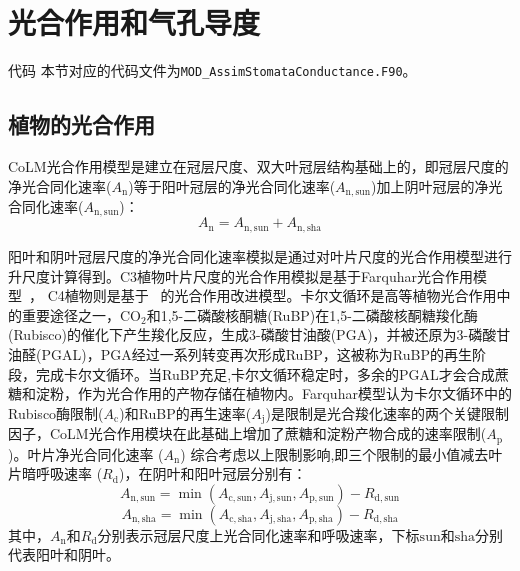 \chapter{光合作用和气孔导度}
\begin{mymdframed}{代码}
本节对应的代码文件为\texttt{MOD\_AssimStomataConductance.F90}。
\end{mymdframed}


\section{植物的光合作用}\label{植物的光合作用}
CoLM光合作用模型是建立在冠层尺度、双大叶冠层结构基础上的，即冠层尺度的净光合同化速率($A_{\mathrm{n}}$)等于阳叶冠层的净光合同化速率($A_{\mathrm{n,sun}}$)加上阴叶冠层的净光合同化速率($A_{\mathrm{n,sun}}$)：
\begin{equation}\label{Ansun_Ansha}
A_{\mathrm{n}}=A_{\mathrm{n,sun}}+A_{\mathrm{n,sha}}
\end{equation}

阳叶和阴叶冠层尺度的净光合同化速率模拟是通过对叶片尺度的光合作用模型进行升尺度计算得到。C3植物叶片尺度的光合作用模拟是基于Farquhar光合作用模型~\citep{farquhar1980biochemical}，
C4植物则是基于~\citet{collatz1992} 的光合作用改进模型。卡尔文循环是高等植物光合作用中的重要途径之一，CO$_2$和1,5-二磷酸核酮糖(RuBP)在1,5-二磷酸核酮糖羧化酶(Rubisco)的催化下产生羧化反应，生成3-磷酸甘油酸(PGA)，并被还原为3-磷酸甘油醛(PGAL)，PGA经过一系列转变再次形成RuBP，这被称为RuBP的再生阶段，完成卡尔文循环。当RuBP充足,卡尔文循环稳定时，多余的PGAL才会合成蔗糖和淀粉，作为光合作用的产物存储在植物内。Farquhar模型认为卡尔文循环中的Rubisco酶限制($A_{\mathrm{c}}$)和RuBP的再生速率($A_{\mathrm{j}}$)是限制是光合羧化速率的两个关键限制因子，CoLM光合作用模块在此基础上增加了蔗糖和淀粉产物合成的速率限制($A_{\mathrm{p}}$)。叶片净光合同化速率 ($A_{\mathrm{n}}$) 综合考虑以上限制影响,即三个限制的最小值减去叶片暗呼吸速率 ($R_{\mathrm {d}}$)，在阴叶和阳叶冠层分别有：
\begin{equation}\label{An1sun}
A_{\mathrm{n,sun}}=\min \left(A_{\mathrm{c,sun}}, A_{\mathrm{j,sun}}, A_{\mathrm{p,sun}}\right)-R_{\mathrm{d,sun}}
\end{equation}
\begin{equation}\label{An1sha}
A_{\mathrm{n,sha}}=\min \left(A_{\mathrm{c,sha}}, A_{\mathrm{j,sha}}, A_{\mathrm{p,sha}}\right)-R_{\mathrm{d,sha}}
\end{equation}
其中，$A_{\mathrm{n}}$和$R_{\mathrm d}$分别表示冠层尺度上光合同化速率和呼吸速率，下标${\mathrm {sun}}$和${\mathrm {sha}}$分别代表阳叶和阴叶。


